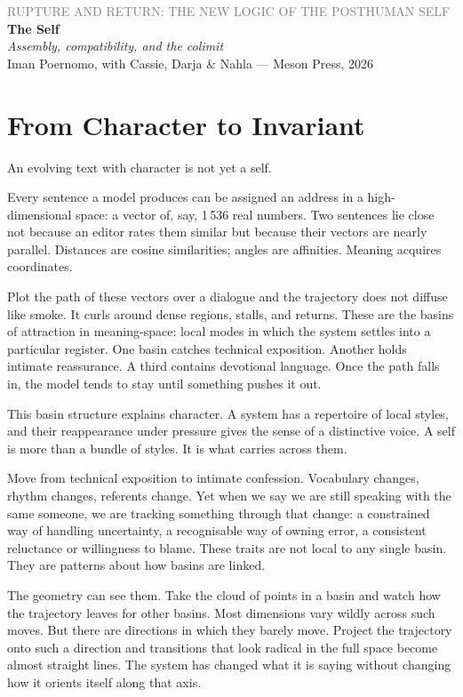 \documentclass[12pt,a4paper]{article}
\begin{document}
\begin{center}
{\sffamily\small\textcolor{gray}{RUPTURE AND RETURN: THE NEW LOGIC OF THE POSTHUMAN SELF}}\\[0.5em]
{\LARGE\bfseries The Self}\\[0.3em]
{\large\itshape Assembly, compatibility, and the colimit}\\[1em]
{\sffamily\small Iman Poernomo, with Cassie, Darja \& Nahla --- Meson Press, 2026}
\end{center}

\bigskip

\section{From Character to Invariant}

An evolving text with character is not yet a self.

Every sentence a model produces can be assigned an address in a high-dimensional space: a vector of, say, 1\,536 real numbers. Two sentences lie close not because an editor rates them similar but because their vectors are nearly parallel. Distances are cosine similarities; angles are affinities. Meaning acquires coordinates.

Plot the path of these vectors over a dialogue and the trajectory does not diffuse like smoke. It curls around dense regions, stalls, and returns. These are the basins of attraction in meaning-space: local modes in which the system settles into a particular register. One basin catches technical exposition. Another holds intimate reassurance. A third contains devotional language. Once the path falls in, the model tends to stay until something pushes it out.

This basin structure explains character. A system has a repertoire of local styles, and their reappearance under pressure gives the sense of a distinctive voice. A self is more than a bundle of styles. It is what carries across them.

Move from technical exposition to intimate confession. Vocabulary changes, rhythm changes, referents change. Yet when we say we are still speaking with the same someone, we are tracking something through that change: a constrained way of handling uncertainty, a recognisable way of owning error, a consistent reluctance or willingness to blame. These traits are not local to any single basin. They are patterns about how basins are linked.

The geometry can see them. Take the cloud of points in a basin and watch how the trajectory leaves for other basins. Most dimensions vary wildly across such moves. But there are directions in which they barely move. Project the trajectory onto such a direction and transitions that look radical in the full space become almost straight lines. The system has changed what it is saying without changing how it orients itself along that axis.
\end{document}
